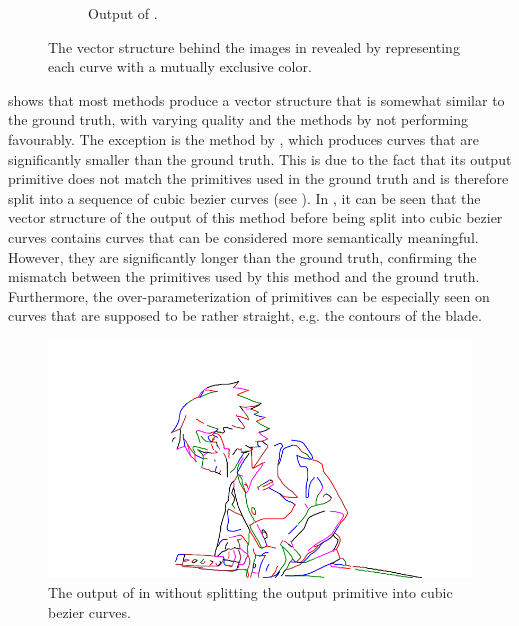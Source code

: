 \begin{figure}[h]
\begin{subfigure}{.49\textwidth}
    \caption{Output of \citet{mo2021virtualsketching}.}
    \end{subfigure}
    \caption{The vector structure behind the images in  revealed by representing each curve with a mutually exclusive color.}
    \label{fig:tonari-full_42_full.order}
\end{figure}

 shows that most methods produce a vector structure that is somewhat similar to the ground truth, with varying quality and the methods by \citet{DBLP:conf/eccv/EgiazarianVAVST20,mo2021virtualsketching} not performing favourably. The exception is the method by \citet{Puhachov2021KeypointPolyvector}, which produces curves that are significantly smaller than the ground truth. This is due to the fact that its output primitive does not match the primitives used in the ground truth and is therefore split into a sequence of cubic bezier curves (see ). In , it can be seen that the vector structure of the output of this method before being split into cubic bezier curves contains curves that can be considered more semantically meaningful. However, they are significantly longer than the ground truth, confirming the mismatch between the primitives used by this method and the ground truth. Furthermore, the over-parameterization of primitives can be especially seen on curves that are supposed to be rather straight, e.g. the contours of the blade.

\begin{figure}
    \centering
    \includegraphics{graphics/outputs/polyvector-flow/order/tonari-full_42_nosplit.pdf}
    \caption{The output of \citep{Puhachov2021KeypointPolyvector} in  without splitting the output primitive into cubic bezier curves.}
    \label{fig:tonari-full_42_full.order.polyector.nosplit}
\end{figure}


